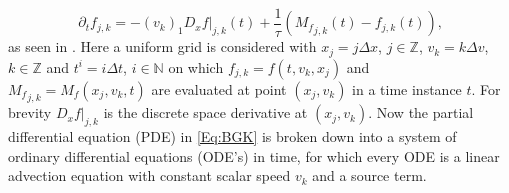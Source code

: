 \begin{equation}
	\partial_t f_{j,k} = -(v_k)_1D_x f|_{j,k}(t) + \frac{1}{\tau}({M_f}_{j,k}(t) - f_{j,k}(t)) \text{,}
	\label{Eq:Discrete BGK}
\end{equation}
as seen in \cite{puppo2019kinetic}. Here a uniform grid is considered with \(x_j = j\Delta x\), \(j \in \mathbb{Z}\), \(v_k = k\Delta v\), \(k \in \mathbb{Z}\) and \(t^i = i \Delta t\), \(i \in \mathbb{N}\) on which \(f_{j,k} = f(t,v_k,x_j)\) and \({M_f}_{j,k} = M_f(x_j,v_k,t)\) are evaluated at point \((x_j,v_k)\) in a time instance \(t\). For brevity \(D_x f|_{j,k}\) is the discrete space derivative at \((x_j,v_k)\). Now the partial differential equation (PDE) in \cref{Eq:BGK} is broken down into a system of ordinary differential equations (ODE's) in time, for which every ODE is a linear advection equation with constant scalar speed \(v_k\) and a source term.\\

